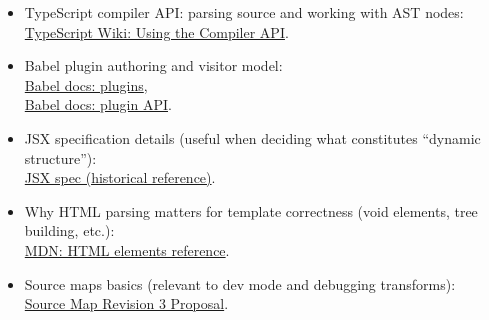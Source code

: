 \begin{itemize}
\item TypeScript compiler API: parsing source and working with AST nodes:\\
\href{https://github.com/microsoft/TypeScript/wiki/Using-the-Compiler-API}{TypeScript Wiki: Using the Compiler API}.

\item Babel plugin authoring and visitor model:\\
\href{https://babeljs.io/docs/en/plugins}{Babel docs: plugins},\\
\href{https://babeljs.io/docs/en/babel-plugin-api}{Babel docs: plugin API}.

\item JSX specification details (useful when deciding what constitutes ``dynamic structure''):\\
\href{https://facebook.github.io/jsx/}{JSX spec (historical reference)}.

\item Why HTML parsing matters for template correctness (void elements, tree building, etc.):\\
\href{https://developer.mozilla.org/en-US/docs/Web/HTML/Element}{MDN: HTML elements reference}.

\item Source maps basics (relevant to dev mode and debugging transforms):\\
\href{https://sourcemaps.info/spec.html}{Source Map Revision 3 Proposal}.
\end{itemize}
